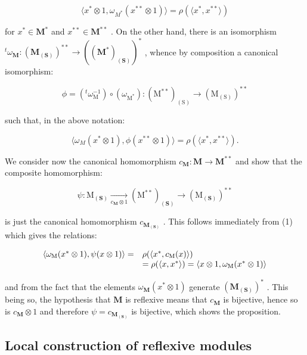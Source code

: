 \[
\langle x ^ {*} \otimes 1, \omega_ {M ^ {*}} (x ^ {* *} \otimes 1) \rangle = \rho (\langle x ^ {*}, x ^ {* *} \rangle)
\]

for \(x^{*} \in \mathbf{M}^{*}\) and \(x^{**} \in \mathbf{M}^{**}\) . On the other hand, there is an isomorphism \(^t\omega_{\mathbf{M}}: (\mathbf{M}_{(\mathbf{S})})^{**} \to ((\mathbf{M}^{*})_{(\mathbf{S})})^{*}\) , whence by composition a canonical isomorphism:

\[
\phi = \left(^ {t} \omega_ {\mathrm{M}} ^ {- 1}\right) \circ (\omega_ {\mathrm{M} ^ {*}}): (\mathrm{M} ^ {* *}) _ {(\mathrm{S})} \rightarrow (\mathrm{M} _ {(\mathrm{S})}) ^ {* *}
\]

such that, in the above notation:

\[
\langle \omega_ {M} (x ^ {*} \otimes 1), \phi (x ^ {* *} \otimes 1) \rangle = \rho (\langle x ^ {*}, x ^ {* *} \rangle).\tag{1}
\]

We consider now the canonical homomorphism \(c_{\mathbf{M}}: \mathbf{M} \to \mathbf{M}^{**}\) and show that the composite homomorphism:

\[
\psi : \mathrm{M} _ {(\mathbf {S})} \xrightarrow [ c _ {\mathbf {M}} \otimes 1 ]{} (\mathrm{M} ^ {* *}) _ {(\mathbf {S})} \longrightarrow (\mathrm{M} _ {(\mathbf {S})}) ^ {* *}\tag{2}
\]

is just the canonical homomorphism \(c_{\mathbf{M}_{(\mathbf{S})}}\) . This follows immediately from (1) which gives the relations:

\[
\begin{array}{r l} \langle \omega_ {\mathrm{M}} (x ^ {*} \otimes 1), \psi (x \otimes 1) \rangle = & \rho (\langle x ^ {*}, c _ {\mathrm{M}} (x) \rangle) \\ & = \rho (\langle x, x ^ {*} \rangle) = \langle x \otimes 1, \omega_ {\mathrm{M}} (x ^ {*} \otimes 1) \rangle \end{array}
\]

and from the fact that the elements \(\omega_{\mathbf{M}}(x^{*}\otimes 1)\) generate \((\mathbf{M}_{(\mathbf{S})})^{*}\) . This being so, the hypothesis that \(\mathbf{M}\) is reflexive means that \(c_{\mathbf{M}}\) is bijective, hence so is \(c_{\mathbf{M}}\otimes 1\) and therefore \(\psi = c_{\mathbf{M}_{(\mathbf{S})}}\) is bijective, which shows the proposition.

\subsection{Local construction of reflexive modules}

